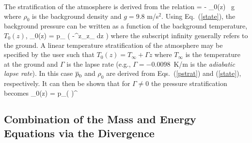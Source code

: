 \documentclass[11pt]{book}
\begin{document}
The stratification of the atmosphere is derived from the relation
\be {} = - \rho_0(z) \, g  \ee
where $\rho_0$ is the background density and $g=9.8$ m/s$^2$. Using Eq.~(\ref{state}), the background pressure can be written as a function of the background temperature, $T_0(z)$,
\be \bp_0(z) = p_\infty \; \exp \; \left( -\int^z_{z_\infty}  dz \right)  \label{pstrat} \ee
where the subscript infinity generally refers to the ground. A linear temperature stratification of the atmosphere may be
specified by the user such that $T_0(z) = T_\infty + \Gamma z$ where $T_\infty$ is the temperature at the ground and
$\Gamma$ is the lapse rate (e.g., $\Gamma = -0.0098$~K/m is the {\em adiabatic lapse rate}).
In this case $\overline{p}_0$ and $\rho_0$ are derived from Eqs.~(\ref{pstrat}) and (\ref{state}), respectively.
It can then be shown that for $\Gamma \ne 0$ the pressure stratification becomes
\be
   \bp_0(z) = p_\infty  \left(  \right)^{}
   \label{pstrat}
\ee


\subsection{Combination of the Mass and Energy Equations via the Divergence}
\end{document}
